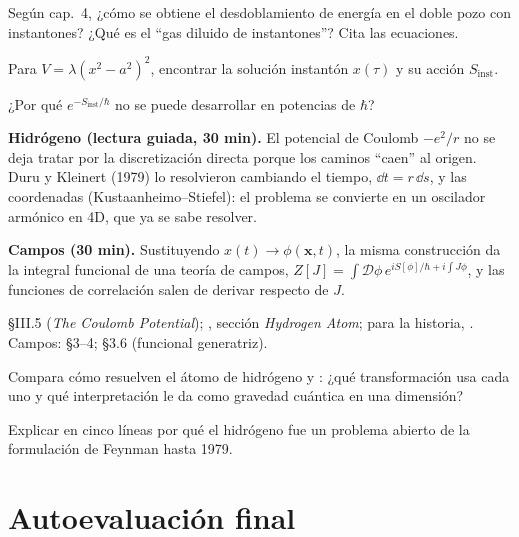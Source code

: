 \begin{prompt}
Según  cap.~4, ¿cómo se obtiene el desdoblamiento de energía en el doble pozo con instantones? ¿Qué es el ``gas diluido de instantones''? Cita las ecuaciones.
\end{prompt}

Para $V=\lambda(x^2-a^2)^2$, encontrar la solución instantón $x(\tau)$ y su acción $S_{\text{inst}}$.

¿Por qué $e^{-S_{\text{inst}}/\hbar}$ no se puede desarrollar en potencias de $\hbar$?


\textbf{Hidrógeno (lectura guiada, 30 min).} El potencial de Coulomb $-e^2/r$ no se deja tratar por la discretización directa porque los caminos ``caen'' al origen. Duru y Kleinert (1979) lo resolvieron cambiando el tiempo, $\dd t=r\,\dd s$, y las coordenadas (Kustaanheimo--Stiefel): el problema se convierte en un oscilador armónico en 4D, que ya se sabe resolver.

\textbf{Campos (30 min).} Sustituyendo $x(t)\to\phi(\mathbf x,t)$, la misma construcción da la integral funcional de una teoría de campos, $Z[J]=\int\mathcal D\phi\,e^{iS[\phi]/\hbar+i\int J\phi}$, y las funciones de correlación salen de derivar respecto de $J$.

 \S III.5 (\textit{The Coulomb Potential}); , sección \textit{Hydrogen Atom}; para la historia, . Campos:  \S3--4;  \S3.6 (funcional generatriz).

\begin{prompt}
Compara cómo resuelven el átomo de hidrógeno  y : ¿qué transformación usa cada uno y qué interpretación le da  como gravedad cuántica en una dimensión?
\end{prompt}

Explicar en cinco líneas por qué el hidrógeno fue un problema abierto de la formulación de Feynman hasta 1979.

\section{Autoevaluación final}
\label{sec:final}

